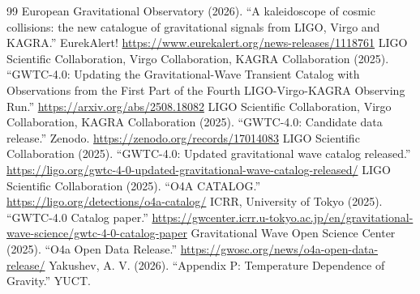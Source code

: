 \documentclass[11pt,a4paper]{article}
\theoremstyle{remark}
\begin{document}
\begin{thebibliography}{99}
		 European Gravitational Observatory (2026). ``A kaleidoscope of cosmic collisions: the new catalogue of gravitational signals from LIGO, Virgo and KAGRA.'' EurekAlert! \url{https://www.eurekalert.org/news-releases/1118761}
		 LIGO Scientific Collaboration, Virgo Collaboration, KAGRA Collaboration (2025). ``GWTC-4.0: Updating the Gravitational-Wave Transient Catalog with Observations from the First Part of the Fourth LIGO-Virgo-KAGRA Observing Run.'' \url{https://arxiv.org/abs/2508.18082}
		 LIGO Scientific Collaboration, Virgo Collaboration, KAGRA Collaboration (2025). ``GWTC-4.0: Candidate data release.'' Zenodo. \url{https://zenodo.org/records/17014083}
		 LIGO Scientific Collaboration (2025). ``GWTC-4.0: Updated gravitational wave catalog released.'' \url{https://ligo.org/gwtc-4-0-updated-gravitational-wave-catalog-released/}
		 LIGO Scientific Collaboration (2025). ``O4A CATALOG.'' \url{https://ligo.org/detections/o4a-catalog/}
		 ICRR, University of Tokyo (2025). ``GWTC-4.0 Catalog paper.'' \url{https://gwcenter.icrr.u-tokyo.ac.jp/en/gravitational-wave-science/gwtc-4-0-catalog-paper}
		 Gravitational Wave Open Science Center (2025). ``O4a Open Data Release.'' \url{https://gwosc.org/news/o4a-open-data-release/}
		 Yakushev, A. V. (2026). ``Appendix P: Temperature Dependence of Gravity.'' YUCT.
	\end{thebibliography}
	
\end{document}
